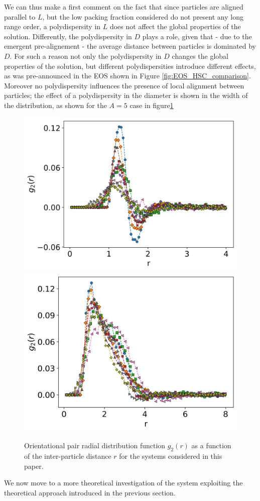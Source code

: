 \documentclass[journal=jacsat,manuscript=article]{achemso}
\begin{document}
We can thus make a first comment on the fact that since particles are aligned parallel to $L$, but the low packing fraction considered do not present any long range order, a polydispersity in $L$ does not affect the global properties of the solution. 
Differently, the polydispersity in $D$ plays a  role, given that - due to the emergent pre-alignement - the average distance between particles is dominated by $D$. For such a reason not only the polydispersity in $D$ changes the global properties of the solution, but different polydispersities introduce different effects, as was pre-announced in the EOS shown in Figure \ref{fig:EOS_HSC_comparison}. Moreover no polydispersity influences the presence of local alignment between particles; the effect of a polydispersity in the diameter is shown in the width of the distribution, as shown for the $A=5$ case in figure\ref{fig:G_or_A5}

  \begin{figure}[!h]
    \centering
    \includegraphics[width=0.45 \columnwidth]{Figures/G_or_A1.png}
    \includegraphics[width=0.45 \columnwidth]{Figures/G_or_A5.png}
    \caption{Orientational pair radial distribution function $g_2(r)$ as a function of the inter-particle distance $r$ for the systems considered in this paper.}
    \label{fig:G_or_A5}
\end{figure}
 
 

We now move to a more theoretical investigation of the system exploiting the theoretical approach introduced in the previous section.
\end{document}
